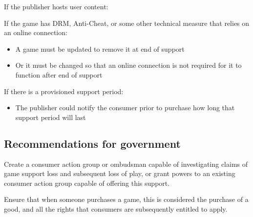 If the publisher hosts user content:

If the game has DRM, Anti-Cheat, or some other technical measure that relies on an online connection:
\begin{itemize}
    \item A game must be updated to remove it at end of support
    \item Or it must be changed so that an online connection is not required for it to function after end of support
\end{itemize}

If there is a provisioned support period:
\begin{itemize}
    \item The publisher could notify the consumer prior to purchase how long that support period will last
\end{itemize}


\subsection{Recommendations for government}

Create a consumer action group or ombudsman capable of investigating claims of game support loss and subsequent loss of play,
or grant powers to an existing consumer action group capable of offering this support.

Ensure that when someone purchases a game, this is considered the purchase of a good, and all the rights that consumers are subsequently entitled to apply.
